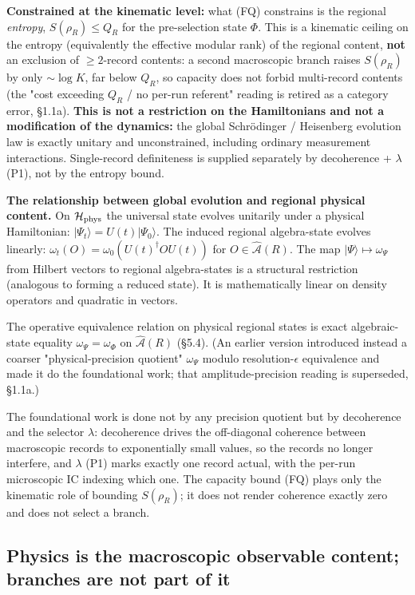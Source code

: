 \documentclass[11pt,a4paper]{article}
\begin{document}
\textbf{Constrained at the kinematic level:} what (FQ) constrains is the regional \emph{entropy}, $S(\rho_R) \le Q_R$ for the pre-selection state $\Phi$. This is a kinematic ceiling on the entropy (equivalently the effective modular rank) of the regional content, \textbf{not} an exclusion of $\ge 2$-record contents: a second macroscopic branch raises $S(\rho_R)$ by only $\sim\!\log K$, far below $Q_R$, so capacity does not forbid multi-record contents (the "cost exceeding $Q_R$ / no per-run referent" reading is retired as a category error, §1.1a). \textbf{This is not a restriction on the Hamiltonians and not a modification of the dynamics:} the global Schrödinger / Heisenberg evolution law is exactly unitary and unconstrained, including ordinary measurement interactions. Single-record definiteness is supplied separately by decoherence + $\lambda$ (P1), not by the entropy bound.

\textbf{The relationship between global evolution and regional physical content.} On $\mathcal{H}_{\rm phys}$ the universal state evolves unitarily under a physical Hamiltonian: $|\Psi_t\rangle = U(t)|\Psi_0\rangle$. The induced regional algebra-state evolves linearly: $\omega_t(O) = \omega_0(U(t)^\dagger O U(t))$ for $O \in \hat{\mathcal{A}}(R)$. The map $|\Psi\rangle \mapsto \omega_\Psi$ from Hilbert vectors to regional algebra-states is a structural restriction (analogous to forming a reduced state). It is mathematically linear on density operators and quadratic in vectors.

The operative equivalence relation on physical regional states is exact algebraic-state equality $\omega_\Psi = \omega_\Phi$ on $\hat{\mathcal{A}}(R)$ (§5.4). (An earlier version introduced instead a coarser "physical-precision quotient" $\omega_\Psi$ modulo resolution-$\epsilon$ equivalence and made it do the foundational work; that amplitude-precision reading is superseded, §1.1a.)

The foundational work is done not by any precision quotient but by decoherence and the selector $\lambda$: decoherence drives the off-diagonal coherence between macroscopic records to exponentially small values, so the records no longer interfere, and $\lambda$ (P1) marks exactly one record actual, with the per-run microscopic IC indexing which one. The capacity bound (FQ) plays only the kinematic role of bounding $S(\rho_R)$; it does not render coherence exactly zero and does not select a branch.

\subsection{Physics is the macroscopic observable content; branches are not part of it}
\end{document}
